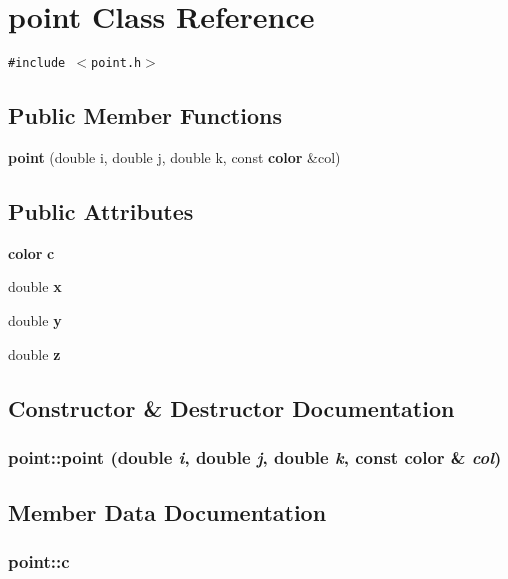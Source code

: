 \section{point Class Reference}
\label{classpoint}
{\tt \#include $<$point.h$>$}

\subsection*{Public Member Functions}
\begin{CompactItemize}
\item 
{\bf point} (double i, double j, double k, const {\bf color} \&col)
\end{CompactItemize}
\subsection*{Public Attributes}
\begin{CompactItemize}
\item 
{\bf color} {\bf c}
\item 
double {\bf x}
\item 
double {\bf y}
\item 
double {\bf z}
\end{CompactItemize}


\subsection{Constructor \& Destructor Documentation}
\subsubsection[{point}]{\setlength{\rightskip}{0pt plus 5cm}point::point (double {\em i}, \/  double {\em j}, \/  double {\em k}, \/  const {\bf color} \& {\em col})\hspace{0.3cm}{\tt  [inline]}}\label{classpoint_4dc8991cb0c71d8367ad701deb4fe69a}




\subsection{Member Data Documentation}
\subsubsection[{c}]{ {\bf point::c}}\label{classpoint_5076e16086af4b1b409a736ab381f904}


